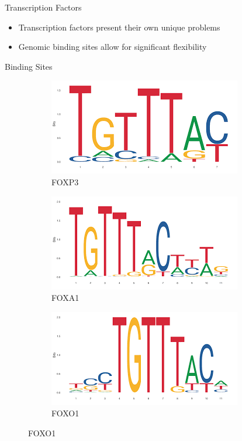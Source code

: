 \documentclass[aspectratio=169,11pt]{beamer}
\begin{document}

\begin{frame}{Transcription Factors}

	\begin{itemize}
		\item Transcription factors present their own unique problems
		\item Genomic binding sites allow for significant flexibility
	\end{itemize}

\end{frame}

\begin{frame}{Binding Sites}

\begin{figure}
\centering
\begin{subfigure}{.33\textwidth}
  \centering
  \includegraphics[width=.8\linewidth]{figures/foxp3Motif.png}
  \caption{FOXP3}
  \label{fig:sub1}
\end{subfigure}%
\begin{subfigure}{.33\textwidth}
  \centering
  \includegraphics[width=.8\linewidth]{figures/foxa1.png}
  \caption{FOXA1}
  \label{fig:sub2}
\end{subfigure}
\begin{subfigure}{.33\textwidth}
  \centering
  \includegraphics[width=.8\linewidth]{figures/foxo1.png}
  \caption{FOXO1}
  \label{fig:sub3}
\end{subfigure}


\end{figure}
\end{frame}
\end{document}
